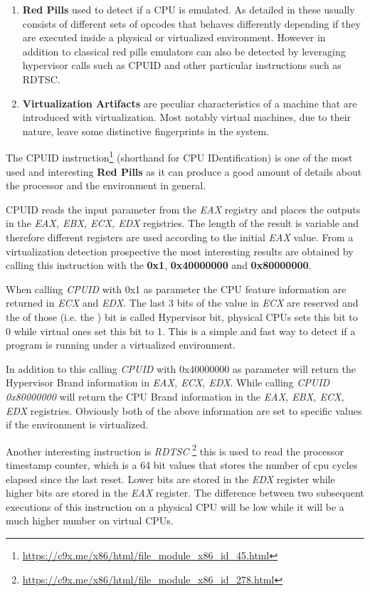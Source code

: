 \begin{enumerate}
    \item \textbf{Red Pills} used to detect if a CPU is emulated. As detailed in \cite{bruschi} these usually consists of different sets of opcodes that behaves differently depending if they are executed inside a physical or virtualized environment. However in addition to classical red pills emulators can also be detected by leveraging hypervisor calls such as CPUID and other particular instructions such as RDTSC.
    \item \textbf{Virtualization Artifacts} are peculiar characteristics of a machine that are introduced with virtualization. Most notably virtual machines, due to their nature, leave some distinctive fingerprints in the system.
\end{enumerate}

The CPUID instruction\footnote{\url{https://c9x.me/x86/html/file_module_x86_id_45.html}} (shorthand for CPU IDentification) is one of the most used and interesting \textbf{Red Pills} as it can produce a good amount of details about the processor and the environment in general.

CPUID reads the input parameter from the \textit{EAX} registry and places the outputs in the \textit{EAX, EBX, ECX, EDX} registries. The length of the result is variable and therefore different registers are used according to the initial \textit{EAX} value. From a virtualization detection prospective the most interesting results are obtained by calling this instruction with the \textbf{0x1}, \textbf{0x40000000} and \textbf{0x80000000}\cite{CPUID}. 

When calling \textit{CPUID} with 0x1 as parameter the CPU feature information are returned in \textit{ECX} and \textit{EDX}. The last 3 bits of the value in \textit{ECX} are reserved and the  of those (i.e. the ) bit is called Hypervisor bit, physical CPUs sets this bit to 0 while virtual ones set this bit to 1. This is a simple and fast way to detect if a program is running under a virtualized environment. 

In addition to this calling \textit{CPUID} with 0x40000000 as parameter will return the Hypervisor Brand information in \textit{EAX, ECX, EDX}. While calling \textit{CPUID 0x80000000} will return the CPU Brand information in the \textit{EAX, EBX, ECX, EDX} registries. Obviously both of the above information are set to specific values if the environment is virtualized. 

Another interesting instruction is \textit{RDTSC} \footnote{\url{https://c9x.me/x86/html/file_module_x86_id_278.html}} this is used to read the processor timestamp counter, which is a 64 bit values that stores the number of cpu cycles elapsed since the last reset. Lower bits are stored in the \textit{EDX} register while higher bits are stored in the \textit{EAX} register. The difference between two subsequent executions of this instruction on a physical CPU will be low while it will be a much higher number on virtual CPUs.


